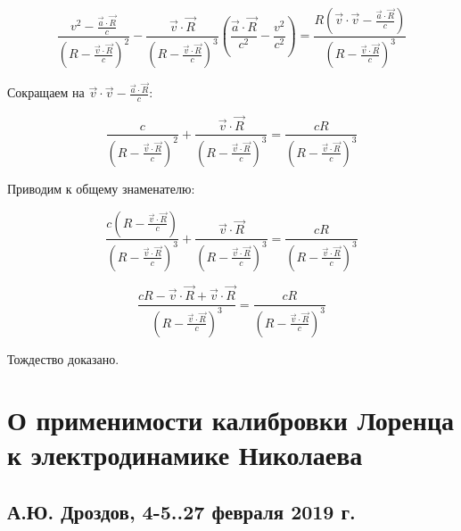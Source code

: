 \documentclass[12pt, a4paper]{article}
\begin{document}
\begin{equation}
\frac{v^2 - \frac{\vec{a} \cdot \vec{R}}{c}}{\left( R - \frac{\vec{v} \cdot \vec{R}}{c} \right)^2} - \frac{\vec{v} \cdot \vec{R}}{\left( R - \frac{\vec{v} \cdot \vec{R}}{c} \right)^3} \left( \frac{\vec{a} \cdot \vec{R}}{c^2} - \frac{v^2}{c^2} \right) = \frac{R (\vec{v} \cdot \vec{v} - \frac{\vec{a} \cdot \vec{R}}{c})}{\left( R - \frac{\vec{v} \cdot \vec{R}}{c} \right)^3}
\label{eq:identity_check2}
\end{equation}

Сокращаем на $\vec{v} \cdot \vec{v} - \frac{\vec{a} \cdot \vec{R}}{c}$:

\begin{equation}
\frac{c}{\left( R - \frac{\vec{v} \cdot \vec{R}}{c} \right)^2} + \frac{\vec{v} \cdot \vec{R}}{\left( R - \frac{\vec{v} \cdot \vec{R}}{c} \right)^3} = \frac{cR}{\left( R - \frac{\vec{v} \cdot \vec{R}}{c} \right)^3}
\label{eq:identity_check3}
\end{equation}

Приводим к общему знаменателю:

\begin{equation}
\frac{c \left( R - \frac{\vec{v} \cdot \vec{R}}{c} \right)}{\left( R - \frac{\vec{v} \cdot \vec{R}}{c} \right)^3} + \frac{\vec{v} \cdot \vec{R}}{\left( R - \frac{\vec{v} \cdot \vec{R}}{c} \right)^3} = \frac{cR}{\left( R - \frac{\vec{v} \cdot \vec{R}}{c} \right)^3}
\label{eq:identity_check4}
\end{equation}

\begin{equation}
\frac{cR - \vec{v} \cdot \vec{R} + \vec{v} \cdot \vec{R}}{\left( R - \frac{\vec{v} \cdot \vec{R}}{c} \right)^3} = \frac{cR}{\left( R - \frac{\vec{v} \cdot \vec{R}}{c} \right)^3}
\label{eq:identity_check5}
\end{equation}

Тождество доказано.

\section{О применимости калибровки Лоренца к электродинамике Николаева}
\label{sec:work09}

\subsection*{А.Ю. Дроздов, 4-5..27 февраля 2019 г.}
\end{document}
